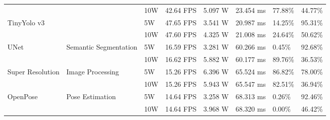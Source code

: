 \begin{table}[]
{\begin{tabular}{|l|l|l|l|l|l|l|l|}
                                  &                                        & 10W           & 42.64 FPS       & 5.097 W           & 23.454 ms   & 77.88\%  & 44.77\%  \\ \cline{1-1} \cline{3-8} 
\multirow{2}{*}{TinyYolo v3}      &                                        & 5W            & 47.65 FPS       & 3.541 W           & 20.987 ms   & 14.25\%  & 95.31\%  \\ \cline{3-8} 
                                  &                                        & 10W           & 47.60 FPS       & 4.325 W           & 21.008 ms   & 24.64\%  & 50.62\%  \\ \hline
\multirow{2}{*}{UNet}             & \multirow{2}{*}{Semantic Segmentation} & 5W            & 16.59 FPS       & 3.281 W           & 60.266 ms   & 0.45\%   & 92.68\%  \\ \cline{3-8} 
                                  &                                        & 10W           & 16.62 FPS       & 5.882 W           & 60.177 ms   & 89.76\%  & 36.53\%  \\ \hline
\multirow{2}{*}{Super Resolution} & \multirow{2}{*}{Image Processing}      & 5W            & 15.26 FPS       & 6.396 W           & 65.524 ms   & 86.82\%  & 78.00\%  \\ \cline{3-8} 
                                  &                                        & 10W           & 15.26 FPS       & 5.943 W           & 65.547 ms   & 82.51\%  & 36.94\%  \\ \hline
\multirow{2}{*}{OpenPose}         & \multirow{2}{*}{Pose Estimation}       & 5W            & 14.64 FPS       & 3.258 W           & 68.313 ms   & 0.26\%   & 92.46\%  \\ \cline{3-8} 
                                  &                                        & 10W           & 14.64 FPS       & 3.968 W           & 68.320 ms   & 0.00\%   & 46.42\%  \\ \hline
\end{tabular}%
}
\end{table}

